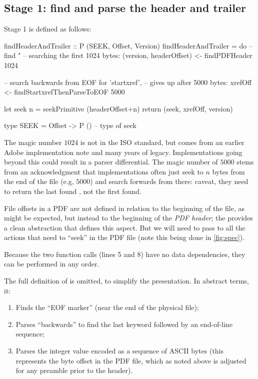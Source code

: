 \subsection{Stage 1: find and parse the header and trailer}
\label{sec:stage-1}

Stage 1 is defined as follows:
\begin{code}
findHeaderAndTrailer :: P (SEEK, Offset, Version)
findHeaderAndTrailer =
    do
    -- find "%
    -- searching the first 1024 bytes:
    (version, headerOffset) <- findPDFHeader 1024

    -- search backwards from EOF for 'startxref',
    -- gives up after 5000 bytes:
    xrefOff <- findStartxrefThenParseToEOF 5000
    
    let seek n = seekPrimitive (headerOffset+n)
    return (seek, xrefOff, version)
    
type SEEK = Offset -> P () -- type of seek
\end{code}

The magic number $1024$ is not in the ISO standard, but comes from an earlier Adobe implementation note and many years of legacy.  Implementations going beyond this could result in a parser differential.
The magic number of $5000$ stems from an acknowledgment that implementations often just seek to 
$n$ bytes from the end of the file (e.g, $5000$) and search forwards from there: caveat, they need to return the last found , not the first found.

File offsets in a PDF are not defined in relation to the beginning of
the file, as might be expected, but instead to the beginning of the
\emph{PDF header};
%
the  provides a clean abstraction that defines this
aspect.
%
But we will need to pass  to all the actions that need to
``seek'' in the PDF file (note this being done in \cref{fig:spec}).

Because the two function calls (lines 5 and 8) have no data
dependencies, they can be performed in any order.
%

The full definition of  is
omitted, to simplify the presentation.
%
In abstract terms, it:
\begin{enumerate}
\item Finds the ``EOF marker''  (near the end of the physical
  file);
\item Parses ``backwards'' to find the last  keyword
  followed by an end-of-line sequence;
\item Parses the integer value encoded as a sequence of ASCII bytes
  (this represents the byte offset in the PDF file, which as noted
  above is adjusted for any preamble prior to the header).
\end{enumerate}

